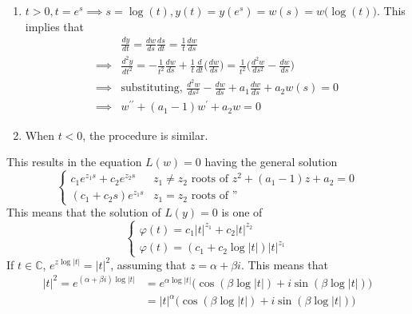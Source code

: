 \documentclass{article}
\begin{document}
      \begin{enumerate}
          \item $t > 0, t = e^s \implies s = \log(t), y(t) = y(e^s) = w(s) = w \big( \log(t)\big)$. This implies that
          \begin{align*}
              & \frac{d y}{d t} = \frac{dw}{ds} \frac{ds}{dt} = \frac{1}{t} \frac{dw}{ds} \\
              \implies & \frac{d^2 y}{dt^2} = -\frac{1}{t^2} \frac{dw}{ds} + \frac{1}{t} \frac{d}{dt} \bigg( \frac{dw}{ds}\bigg) = \frac{1}{t^2} \bigg( \frac{d^2 w}{ds^2} - \frac{dw}{ds} \bigg) \\
              \implies & \text{substituting, } \frac{d^2 w}{ds^2} - \frac{dw}{ds} + a_1 \frac{dw}{ds} + a_2 w(s) = 0 \\
              \implies & w^{\prime\prime} + (a_1 - 1) w^\prime + a_2 w = 0
          \end{align*}
          \item When $t<0$, the procedure is similar. 
      \end{enumerate}
      This results in the equation $L(w) =0$ having the general solution 
      \begin{equation}
        \begin{cases}
              c_1 e^{z_1 s} + c_2 e^{z_2 s} & z_1 \neq z_2 \text{ roots of } z^2 + (a_1 - 1) z + a_2 = 0 \\
              (c_1 + c_2 s) e^{z_1 s} & z_1 = z_2 \text{ roots of ''}
              \end{cases}
      \end{equation}
      This means that the solution of $L(y) = 0$ is one of
      \begin{equation}
        \begin{cases}
              \varphi(t) = c_1 |t|^{z_1} + c_2 |t|^{z_2} \\
              \varphi(t) = (c_1 + c_2 \log|t|) |t|^{z_1}
              \end{cases}
      \end{equation}
      If $t \in \mathbb{C}$, $e^{z \log|t|} = |t|^2$, assuming that $z = \alpha + \beta i$. This means that 
      \begin{align*}
          |t|^2 = e^{(\alpha + \beta i) \log|t|} & = e^{\alpha \log|t|} \big( \cos{(\beta \log|t|)} + i \sin{(\beta \log|t|)}\big) \\
          & = |t|^\alpha \big( \cos{(\beta \log|t|)} + i \sin{(\beta \log|t|)}\big)
      \end{align*}
\end{document}
